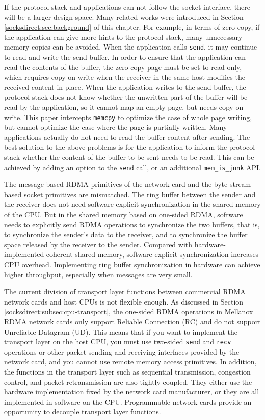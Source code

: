 If the protocol stack and applications can not follow the socket interface, there will be a larger design space. Many related works were introduced in Section \ref{socksdirect:sec:background} of this chapter. For example, in terms of zero-copy, if the application can give more hints to the protocol stack, many unnecessary memory copies can be avoided. When the application calls \texttt{send}, it may continue to read and write the send buffer. In order to ensure that the application can read the contents of the buffer, the zero-copy page must be set to read-only, which requires copy-on-write when the receiver in the same host modifies the received content in place. When the application writes to the send buffer, the protocol stack does not know whether the unwritten part of the buffer will be read by the application, so it cannot map an empty page, but needs copy-on-write. This paper intercepts \texttt{memcpy} to optimize the case of whole page writing, but cannot optimize the case where the page is partially written. Many applications actually do not need to read the buffer content after sending. The best solution to the above problems is for the application to inform the protocol stack whether the content of the buffer to be sent needs to be read. This can be achieved by adding an option to the \texttt{send} call, or an additional \texttt{mem\_is\_junk} API.

The message-based RDMA primitives of the network card and the byte-stream-based socket primitives are mismatched. The ring buffer between the sender and the receiver does not need software explicit synchronization in the shared memory of the CPU. But in the shared memory based on one-sided RDMA, software needs to explicitly send RDMA operations to synchronize the two buffers, that is, to synchronize the sender's data to the receiver, and to synchronize the buffer space released by the receiver to the sender. Compared with hardware-implemented coherent shared memory, software explicit synchronization increases CPU overhead. Implementing ring buffer synchronization in hardware can achieve higher throughput, especially when messages are very small.

The current division of transport layer functions between commercial RDMA network cards and host CPUs is not flexible enough. As discussed in Section \ref{socksdirect:subsec:cpu-transport}, the one-sided RDMA operations in Mellanox RDMA network cards only support Reliable Connection (RC) and do not support Unreliable Datagram (UD). This means that if you want to implement the transport layer on the host CPU, you must use two-sided \texttt{send} and \texttt{recv} operations or other packet sending and receiving interfaces provided by the network card, and you cannot use remote memory access primitives. In addition, the functions in the transport layer such as sequential transmission, congestion control, and packet retransmission are also tightly coupled. They either use the hardware implementation fixed by the network card manufacturer, or they are all implemented in software on the CPU. Programmable network cards provide an opportunity to decouple transport layer functions.

